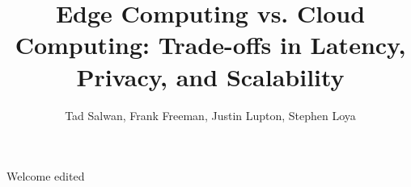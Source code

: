 \documentclass[10pt,a4paper]{article}
\title{Edge Computing vs. Cloud Computing: Trade-offs in Latency, Privacy, and Scalability}
\author{Tad Salwan, Frank Freeman, Justin Lupton, Stephen Loya}
\begin{document}
	\maketitle
	Welcome edited
\end{document}

